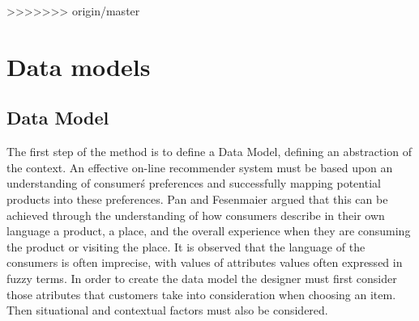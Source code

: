 >>>>>>> origin/master




\section{Data models} 
\subsection{Data Model}
The first step of the method is to define a Data Model, 
defining an abstraction of the context. An effective on-line 
recommender system must be based upon an
understanding of consumer\'s  preferences and successfully mapping
potential products into these
preferences\cite{adomavicius2011context}. Pan and
Fesenmaier\cite{pan2006online} argued that this can be achieved
through the understanding of how consumers describe in their own
language a product, a place, and the overall experience when they are
consuming the product or visiting the place. It is observed that 
the language of the consumers is often imprecise, with values of attributes 
values often expressed in fuzzy terms. In order to create the data model
the designer must first consider those atributes that customers
take into consideration when choosing an item. Then situational 
and contextual factors must also be considered. 



